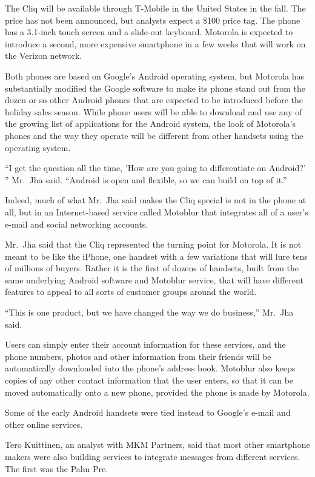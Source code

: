 ﻿\documentclass[12pt]{article}
\begin{document}
The Cliq will be available through T-Mobile in the United States in the fall. The price has not been
announced, but analysts expect a \$100 price tag. The phone has a 3.1-inch touch screen and a
slide-out keyboard. Motorola is expected to introduce a second, more expensive smartphone in a few
weeks that will work on the Verizon network.

Both phones are based on Google's Android operating system, but Motorola has substantially modified
the Google software to make its phone stand out from the dozen or so other Android phones that are
expected to be introduced before the holiday sales season. While phone users will be able to
download and use any of the growing list of applications for the Android system, the look of
Motorola's phones and the way they operate will be different from other handsets using the operating
system.

``I get the question all the time, 'How are you going to differentiate on Android?' '' Mr.~Jha said.
``Android is open and flexible, so we can build on top of it.''

Indeed, much of what Mr.~Jha said makes the Cliq special is not in the phone at all, but in an
Internet-based service called Motoblur that integrates all of a user's e-mail and social networking
accounts.

Mr.~Jha said that the Cliq represented the turning point for Motorola. It is not meant to be like
the iPhone, one handset with a few variations that will lure tens of millions of buyers. Rather it
is the first of dozens of handsets, built from the same underlying Android software and Motoblur
service, that will have different features to appeal to all sorts of customer groups around the
world.

``This is one product, but we have changed the way we do business,'' Mr.~Jha said.

Users can simply enter their account information for these services, and the phone numbers, photos
and other information from their friends will be automatically downloaded into the phone's address
book. Motoblur also keeps copies of any other contact information that the user enters, so that it
can be moved automatically onto a new phone, provided the phone is made by Motorola.

Some of the early Android handsets were tied instead to Google's e-mail and other online services.

Tero Kuittinen, an analyst with MKM Partners, said that most other smartphone makers were also
building services to integrate messages from different services. The first was the Palm Pre.
\end{document}
